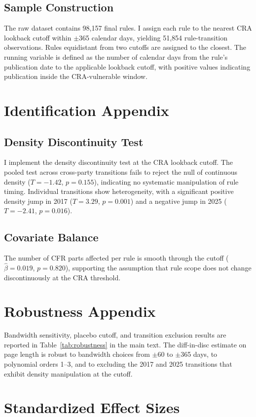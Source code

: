 \documentclass[12pt]{article}
\begin{document}
\subsection{Sample Construction}

The raw dataset contains 98,157 final rules. I assign each rule to the nearest CRA lookback cutoff within $\pm$365 calendar days, yielding 51,854 rule-transition observations. Rules equidistant from two cutoffs are assigned to the closest. The running variable is defined as the number of calendar days from the rule's publication date to the applicable lookback cutoff, with positive values indicating publication inside the CRA-vulnerable window.

\section{Identification Appendix}

\subsection{Density Discontinuity Test}

I implement the \citet{cattaneo2020rdrobust} density discontinuity test at the CRA lookback cutoff. The pooled test across cross-party transitions fails to reject the null of continuous density ($T = -1.42$, $p = 0.155$), indicating no systematic manipulation of rule timing. Individual transitions show heterogeneity, with a significant positive density jump in 2017 ($T = 3.29$, $p = 0.001$) and a negative jump in 2025 ($T = -2.41$, $p = 0.016$).

\subsection{Covariate Balance}

The number of CFR parts affected per rule is smooth through the cutoff ($\hat{\beta} = 0.019$, $p = 0.820$), supporting the assumption that rule scope does not change discontinuously at the CRA threshold.

\section{Robustness Appendix}

Bandwidth sensitivity, placebo cutoff, and transition exclusion results are reported in Table~\ref{tab:robustness} in the main text. The diff-in-disc estimate on page length is robust to bandwidth choices from $\pm$60 to $\pm$365 days, to polynomial orders 1--3, and to excluding the 2017 and 2025 transitions that exhibit density manipulation at the cutoff.

\section{Standardized Effect Sizes}
\label{sec:sde}


\end{document}
